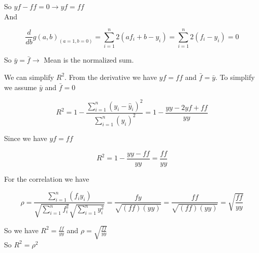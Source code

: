 So $yf - ff = 0 \rightarrow yf = ff $ \\


And

\[ \frac{d}{db}g(a,b)_{(a = 1, b = 0)} = \sum\limits_{i=1}^n 2(af_i + b - y_i) = \sum\limits_{i=1}^n 2(f_i - y_i) = 0  \]

So $\bar{y} = \bar{f} \rightarrow$ Mean is the normalized sum.


\noindent We can simplify $R^2$. From the derivative we have $yf = ff$ and $\bar{f} = \bar{y}$. To simplify we assume $\bar{y}$ and $\bar{f} = 0 $

\[ R^2 = 1 - \frac{\sum\limits_{i=1}^n (y_i - \hat{y}_i)^2}{\sum\limits_{i=1}^n (y_i)^2} = 1 - \frac{yy - 2yf + ff}{yy} \]

Since we have $yf = ff$

\[ R^2 = 1 - \frac{yy - ff}{yy}  = \frac{ff}{yy}\]

For the correlation we have 

\[ \rho =  \frac{\sum\limits_{i=1}^n(f_i y_i)}{\sqrt{\sum\limits_{i=1}^n f_i ^2}\sqrt{\sum\limits_{i=1}^n y_i^2}}  = \frac{fy}{\sqrt{(ff)(yy)}} = \frac{ff}{\sqrt{(ff)(yy)}} = \sqrt{\frac{ff}{yy}}\]



So we have $R^2 = \frac{ff}{yy}$ and $\rho = \sqrt{\frac{ff}{yy}}$\\


So $R^2 = \rho^2$













